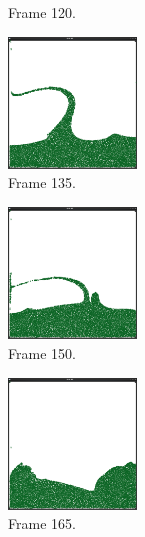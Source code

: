 \begin{figure}[ht!]
\begin{subfigure}[]{0.3\textwidth}
\caption{Frame 120.}
\end{subfigure}
\begin{subfigure}[]{0.3\textwidth}
\includegraphics[height=35mm]{png/pcg9.png}
\caption{Frame 135.}
\end{subfigure}
\begin{subfigure}[]{0.3\textwidth}
\includegraphics[height=35mm]{png/pcg10.png}
\caption{Frame 150.}
\end{subfigure}
\begin{subfigure}[]{0.3\textwidth}
\includegraphics[height=35mm]{png/pcg11.png}
\caption{Frame 165.}
\end{subfigure}
\caption{}
\label{appB}
\end{figure}

